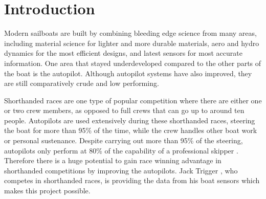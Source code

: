 \documentclass[12pt,twoside]{report}
\date{September 2021}
\begin{document}



\pagestyle{fancy}

\tableofcontents 


\clearpage{\pagestyle{empty}%
}
\fancyhead[LE,RO]{\slshape \rightmark}
\fancyhead[LO,RE]{\slshape \leftmark}


\chapter{Introduction}


Modern sailboats are built by combining bleeding edge science from many areas, including material science for lighter and more durable materials, aero and hydro dynamics for the most efficient designs, and latest sensors for most accurate information. One area that stayed underdeveloped compared to the other parts of the boat is the autopilot. Although autopilot systems have also improved, they are still comparatively crude and low performing.

Shorthanded races are one type of popular competition where there are either one or two crew members, as opposed to full crews that can go up to around ten people. Autopilots are used extensively during these shorthanded races, steering the boat for more than 95\% of the time, while the crew handles other boat work or personal sustenance. Despite carrying out more than 95\% of the steering, autopilots only perform at 80\% of the capability of a professional skipper \cite{roman}. Therefore there is a huge potential to gain race winning advantage in shorthanded competitions by improving the autopilots. Jack Trigger \cite{trigger-racing}, who competes in shorthanded races, is providing the data from his boat sensors which makes this project possible. 
\end{document}
